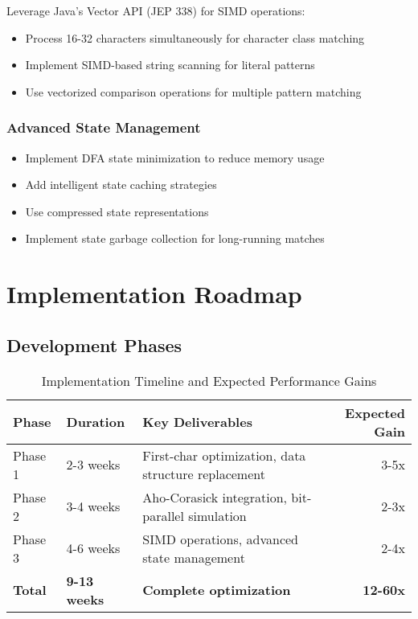 \documentclass[11pt,a4paper]{article}
\begin{document}
Leverage Java's Vector API (JEP 338) for SIMD operations:
\begin{itemize}
\item Process 16-32 characters simultaneously for character class matching
\item Implement SIMD-based string scanning for literal patterns
\item Use vectorized comparison operations for multiple pattern matching
\end{itemize}

\subsubsection{Advanced State Management}

\begin{itemize}
\item Implement DFA state minimization to reduce memory usage
\item Add intelligent state caching strategies
\item Use compressed state representations
\item Implement state garbage collection for long-running matches
\end{itemize}

\section{Implementation Roadmap}

\subsection{Development Phases}

\begin{table}[htbp]
\centering
\begin{tabular}{@{}lllr@{}}
\toprule
\textbf{Phase} & \textbf{Duration} & \textbf{Key Deliverables} & \textbf{Expected Gain} \\
\midrule
Phase 1 & 2-3 weeks & First-char optimization, data structure replacement & 3-5x \\
Phase 2 & 3-4 weeks & Aho-Corasick integration, bit-parallel simulation & 2-3x \\
Phase 3 & 4-6 weeks & SIMD operations, advanced state management & 2-4x \\
\midrule
\textbf{Total} & \textbf{9-13 weeks} & \textbf{Complete optimization} & \textbf{12-60x} \\
\bottomrule
\end{tabular}
\caption{Implementation Timeline and Expected Performance Gains}
\label{tab:roadmap}
\end{table}
\end{document}
